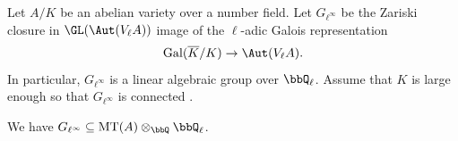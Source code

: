 \begin{proposition} \label{proposition:connected_component_of_zariski_closure_of_rational_ell_adic_galois_group_of_abelian_variety_over_number_field_is_contained_in_mumford_tate_group}
    \TODO{}
    Let $A/K$ be an abelian variety over a number field. Let $G_{\ell^\infty}$ be the Zariski closure in $\GL(\Aut(V_\ell A))$ image of the $\ell$-adic Galois representation
    $$\operatorname{Gal}(\overline{K}/K) \to \Aut(V_\ell A).$$
    In particular, $G_{\ell^\infty}$ is a linear algebraic group over $\bbQ_\ell$.
    Assume that $K$ is large enough so that $G_{\ell^\infty}$ is connected \TODO{}.

    We have $G_{\ell^\infty} \subseteq \mathrm{MT}(A) \otimes_{\bbQ} \bbQ_\ell$. 
\end{proposition}